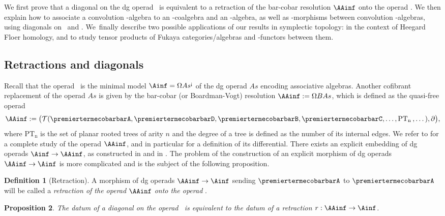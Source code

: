 \documentclass[JEP,XML,SOM,NoFloatCountersInSection,Unicode,published]{cedram}
\theoremstyle{definition}
\newtheorem{definition}{Definition}[section]
\theoremstyle{plain}
\newtheorem{proposition}[definition]{Proposition}
\begin{document}
We first prove that a diagonal on the dg operad \Ainf\ is equivalent to a retraction of the bar-cobar resolution $\AAinf$ onto the operad \Ainf.
We then explain how to associate a convolution \Ainf -algebra to an \Ainf -coalgebra and an \Ainf -algebra, as well as \Ainf\nobreakdash-mor\-phisms between convolution \Ainf -algebras, using diagonals on \Ainf\ and \Minf.
We~finally describe two possible applications of our results in symplectic topology: in the context of Heegard Floer homology, and to study tensor products of Fukaya categories/algebras and \Ainf -functors between them.

\subsection{Retractions and diagonals} \label{ss:retract-diag}

Recall that the operad \Ainf\ is the minimal model $\Ainf =\Omega As^{\text{¡}}$ of the dg operad $As$ encoding associative algebras.
Another cofibrant replacement of the operad $As$ is given by the bar-cobar (or Boardman-Vogt) resolution $\AAinf := \Omega B As$, which is defined as the quasi-free operad
\[
\AAinf := \bigl(\mathcal{T} (\premiertermecobarbarA, \premiertermecobarbarD, \premiertermecobarbarB, \premiertermecobarbarC,\dots, \mathrm{PT_n} \text{\hspace{2pt}},\dots), \partial \bigr),
\]
where $\mathrm{PT_n}$ is the set of planar rooted trees of arity $n$ and the degree of a tree is defined as the number of its internal edges.
We refer to \cite[\S 9.3]{LodayVallette12} for a complete study of the operad $\AAinf$, and in particular for a definition of its differential.
There exists an explicit embedding of dg operads $\Ainf \to \AAinf$, as constructed in \cite[\S 4]{MarklShnider06} and in \cite[\S 1.3.1.5]{mazuir-I}.
The problem of the construction of an explicit morphism of dg operads $\AAinf \to \Ainf$ is more complicated and is the subject of the following proposition.

\begin{definition}[Retraction]
A morphism of dg operads $\AAinf \to \Ainf$ sending $\premiertermecobarbarA$ to $\premiertermecobarbarA$ will be called a \emph{retraction of the operad $\AAinf$ onto the operad \Ainf }.
\end{definition}

\begin{proposition}
\label{prop:retract}
The datum of a diagonal on the operad \Ainf\ is equivalent to the datum of a retraction $r : \AAinf \to \Ainf$.
\end{proposition}
\end{document}
